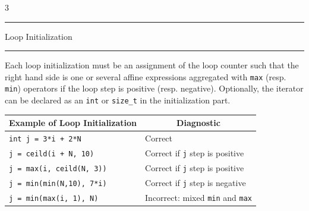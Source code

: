 \documentclass[landscape,a4paper]{article}
\def\titre#1{\begin{center}\hrule\vspace{0.1cm}#1
\vspace{0.07cm}\hrule\end{center}}
\begin{document}
\begin{multicols}{3}
\begin{center}
\end{center}


\titre{Loop Initialization}

\begin{small}
Each loop initialization must be an assignment of the loop counter such that the
right hand side is one or several affine expressions aggregated with {\tt max}
(resp. {\tt min}) operators if the loop step is positive (resp. negative).
Optionally, the iterator can be declared as an {\tt int} or {\tt size\_t}
in the initialization part.

\vspace{0.3cm}
\begin{tabular}{p{4cm}|p{4.39cm}}
\multicolumn{1}{c|}{Example of Loop Initialization} &\multicolumn{1}{c}{Diagnostic}\\
\hline
{\tt int j = 3*i + 2*N} & Correct\\
\hline
{\tt j = ceild(i + N, 10)} & Correct if {\tt j} step is positive\\
\hline
{\tt j = max(i, ceild(N, 3))} & Correct if {\tt j} step is positive\\
\hline
{\tt j = min(min(N,10), 7*i)} & Correct if {\tt j} step is negative\\
\hline
\hline
{\tt j = min(max(i, 1), N)} & Incorrect: mixed {\tt min} and {\tt max}
\end{tabular}


\end{small}
\end{multicols}
\end{document}

